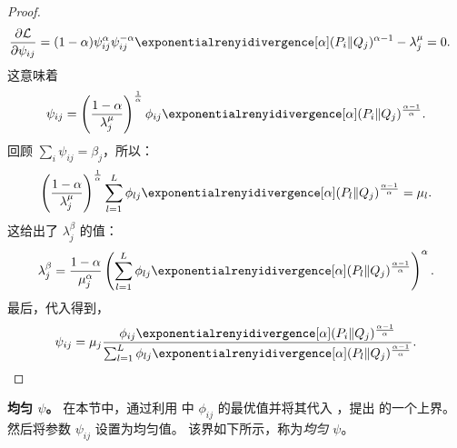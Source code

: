 \begin{proof}
\begin{align*}
        \frac{\partial \mathcal{L}}{\partial \psi_{ij}} &= (1-\alpha) \psi_{ij}^{\alpha} \psi_{ij}^{-\alpha} \exponentialrenyidivergence[\alpha] (P_i\Vert Q_j)^{\alpha-1}-\lambda_j^{\mu} = 0.
    \end{align*}
    这意味着
    \begin{align*}
        \psi_{ij} = \left(\frac{1-\alpha}{\lambda_j^{\mu}}\right)^{\frac{1}{\alpha}}\phi_{ij}\exponentialrenyidivergence[\alpha](P_i\Vert Q_j)^{\frac{\alpha-1}{\alpha}}.
    \end{align*}
    回顾 $\sum_{i}\psi_{ij}=\beta_j$，所以：
    \begin{align*}
        \left(\frac{1-\alpha}{\lambda_j^{\mu}}\right)^{\frac{1}{\alpha}} \sum_{l=1}^L \phi_{lj}\exponentialrenyidivergence[\alpha](P_l\Vert Q_j)^{\frac{\alpha-1}{\alpha}} = \mu_l.
    \end{align*}
    这给出了 $\lambda_j^{\beta}$ 的值：
    \begin{align*}
        \lambda_j^{\beta} = \frac{1-\alpha}{\mu_j^\alpha}\left(\sum_{l=1}^L \phi_{lj}\exponentialrenyidivergence[\alpha](P_l\Vert Q_j)^{\frac{\alpha-1}{\alpha}}\right)^\alpha .
    \end{align*}
    最后，代入得到，
    \begin{align*}
        \psi_{ij} = \mu_j \frac{\phi_{ij}\exponentialrenyidivergence[\alpha](P_i\Vert Q_j)^{\frac{\alpha-1}{\alpha}}}{\sum_{l=1}^L \phi_{lj}\exponentialrenyidivergence[\alpha](P_l\Vert Q_j)^{\frac{\alpha-1}{\alpha}}}.
    \end{align*}
\end{proof}


\textbf{均匀 $\psi$。}
在本节中，通过利用  中 $\phi_{ij}$ 的最优值并将其代入 ，提出  的一个上界。然后将参数 $\psi_{ij}$ 设置为均匀值。
该界如下所示，称为\textit{均匀 $\psi$}。

